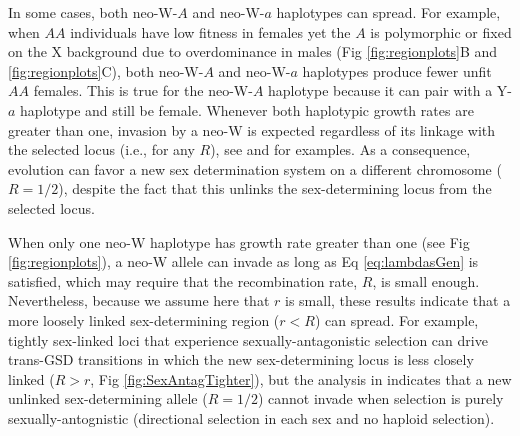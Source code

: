 \documentclass[10pt,letterpaper]{article}
\begin{document}
In some cases, both neo-W-$A$ and neo-W-$a$ haplotypes can spread.
For example, when $AA$ individuals have low fitness in females yet the $A$ is polymorphic or fixed on the X background due to overdominance in males (Fig \ref{fig:regionplots}B and \ref{fig:regionplots}C), both neo-W-$A$ and neo-W-$a$ haplotypes produce fewer unfit $AA$ females.
This is true for the neo-W-$A$ haplotype because it can pair with a Y-$a$ haplotype and still be female. 
Whenever both haplotypic growth rates are greater than one, invasion by a neo-W is expected regardless of its linkage with the selected locus (i.e., for any $R$), see  and  for examples. 
As a consequence, evolution can favor a new sex determination system on a different chromosome ($R = 1/2$), despite the fact that this unlinks the sex-determining locus from the selected locus.

When only one neo-W haplotype has growth rate greater than one (see Fig \ref{fig:regionplots}), a neo-W allele can invade as long as Eq \eqref{eq:lambdasGen} is satisfied, which may require that the recombination rate, $R$, is small enough.
Nevertheless, because we assume here that $r$ is small, these results indicate that a more loosely linked sex-determining region ($r<R$) can spread.
For example, tightly sex-linked loci that experience sexually-antagonistic selection can drive trans-GSD transitions in which the new sex-determining locus is less closely linked ($R>r$, Fig \ref{fig:SexAntagTighter}), but the analysis in  indicates that a new unlinked sex-determining allele ($R=1/2$) cannot invade when selection is purely sexually-antognistic (directional selection in each sex and no haploid selection).
\end{document}
